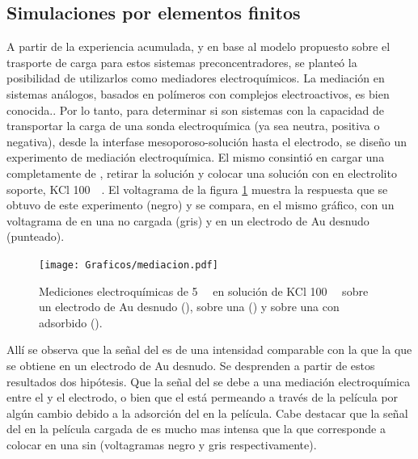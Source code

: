 	\subsection{Simulaciones por elementos finitos}	

		A partir de la experiencia acumulada, y en base al modelo propuesto sobre el trasporte de carga para estos sistemas preconcentradores, se planteó la posibilidad de utilizarlos como mediadores electroquímicos. 
    	La mediación en sistemas análogos, basados en polímeros con complejos electroactivos, es bien conocida.\cite{Kolb1993,Ybarra2005}. Por lo tanto, para determinar si son sistemas con la capacidad de transportar la carga de una sonda electroquímica (ya sea neutra, positiva o negativa), desde la interfase mesoporoso-solución hasta el electrodo, se diseño un experimento de mediación electroquímica. El mismo consintió en cargar una \pdmF\space completamente de \ru, retirar la solución y colocar una solución con \fc\space en electrolito soporte, KCl \SI{100}{\milli\Molar}. El voltagrama de la figura \ref{fig:mediacion} muestra la respuesta que se obtuvo de este experimento (negro) y se compara, en el mismo gráfico, con un voltagrama de \fc\space en una \pdmF\space no cargada (gris) y en un electrodo de Au desnudo (punteado).  

        	\begin{figure}[ht]	
					\centering
			 	    \texttt{[image: Graficos/mediacion.pdf]}
			        \caption[Voltagrama de \ru\space y \fc.]{Mediciones electroquímicas de \fc\space \SI{5}{\milli\Molar} en solución de KCl \SI{100}{\milli\Molar} sobre un electrodo de Au desnudo (\usebox{\punteado}), sobre una \pdmF\space (\usebox{\gris}) y sobre una \pdmF\space con \ru\space adsorbido (\usebox{\negro}).}
			        \label{fig:mediacion}
			      	\end{figure}

		Allí se observa que la señal del \fc\space es de una intensidad comparable con la que la que se obtiene en un electrodo de Au desnudo. Se desprenden a partir de estos resultados dos hipótesis. Que la señal del \fc\space se debe a una mediación electroquímica entre el \ru\space y el electrodo, o bien que el \fc\space está permeando a través de la película por algún cambio debido a la adsorción del \ru\space en la película. Cabe destacar que la señal del \fc\space en la película cargada de \ru\space es mucho mas intensa que la que corresponde a colocar \fc\space en una \pdmF\space sin \ru\space (voltagramas negro y gris respectivamente).


